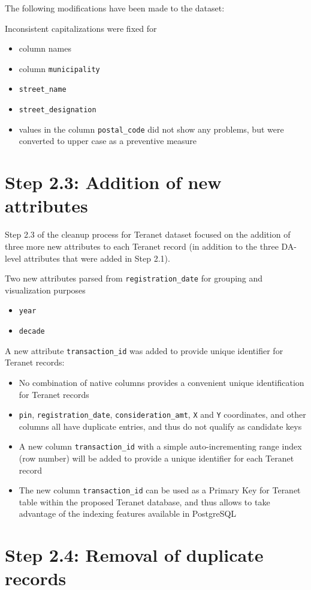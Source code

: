 \documentclass[11pt]{article}
\begin{document}
    The following modifications have been made to the dataset:

    Inconsistent capitalizations were fixed for
    \begin{itemize}
        \item column names
        \item column \texttt{municipality}
        \item \texttt{street\_name}
        \item \texttt{street\_designation}
        \item values in the column \texttt{postal\_code} did not show any problems, but were converted to upper case as a preventive measure
    \end{itemize}

    \section{Step 2.3: Addition of new attributes} \label{sec:teranet_new_cols}

    Step 2.3 of the cleanup process for Teranet dataset focused on the addition of three more new attributes to each Teranet record (in addition to the three DA-level attributes that were added in Step 2.1).

    \vspace{5mm}

    Two new attributes parsed from \texttt{registration\_date} for grouping and visualization purposes
    \begin{itemize}
        \item \texttt{year}
        \item \texttt{decade}
    \end{itemize}

    \vspace{5mm}

    A new attribute \texttt{transaction\_id} was added to provide unique identifier for Teranet records:
    \begin{itemize}
        \item No combination of native columns provides a convenient unique identification for Teranet records
        \item \texttt{pin}, \texttt{registration\_date}, \texttt{consideration\_amt}, \texttt{X} and \texttt{Y} coordinates, and other columns all have duplicate entries, and thus do not qualify as candidate keys
        \item A new column \texttt{transaction\_id} with a simple auto-incrementing range index (row number) will be added to provide a unique identifier for each Teranet record
        \item The new column \texttt{transaction\_id} can be used as a Primary Key for Teranet table within the proposed Teranet database, and thus allows to take advantage of the indexing features available in PostgreSQL
    \end{itemize}

    \section{Step 2.4: Removal of duplicate records} \label{sec:teranet_drop_duplicates}

    \medskip

    
    
\end{document}
